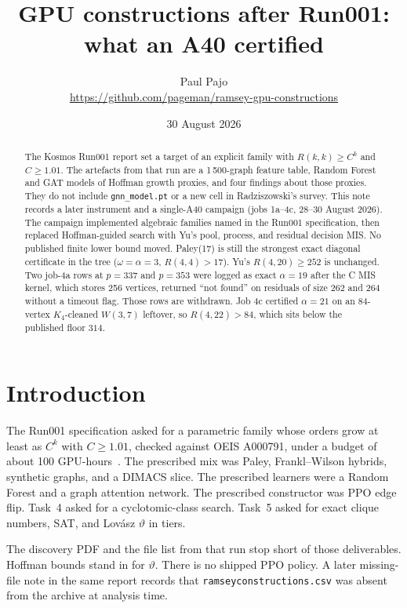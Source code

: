 \documentclass[11pt,a4paper]{article}
\title{GPU constructions after Run001:\\what an A40 certified}
\author{Paul Pajo\\[0.4em]
\small \url{https://github.com/pageman/ramsey-gpu-constructions}}
\date{30 August 2026}
\begin{document}
\maketitle

\begin{abstract}
The Kosmos Run001 report set a target of an explicit family with
$R(k,k)\ge C^k$ and $C\ge 1.01$. The artefacts from that run are a
1\,500-graph feature table, Random Forest and GAT models of Hoffman
growth proxies, and four findings about those proxies. They do not
include \texttt{gnn\_model.pt} or a new cell in Radziszowski's survey.
This note records a later instrument and a single-A40 campaign
(jobs 1a--4c, 28--30 August 2026). The campaign implemented algebraic
families named in the Run001 specification, then replaced Hoffman-guided
search with Yu's pool, process, and residual decision MIS.
No published finite lower bound moved. Paley(17) is still the strongest
exact diagonal certificate in the tree ($\omega=\alpha=3$, $R(4,4)>17$).
Yu's $R(4,20)\ge 252$ is unchanged. Two job-4a rows at $p=337$ and
$p=353$ were logged as exact $\alpha=19$ after the C MIS kernel, which
stores 256 vertices, returned ``not found'' on residuals of size 262 and
264 without a timeout flag. Those rows are withdrawn. Job 4c certified
$\alpha=21$ on an 84-vertex $K_4$-cleaned $W(3,7)$ leftover, so
$R(4,22)>84$, which sits below the published floor $314$.
\end{abstract}

\section{Introduction}

The Run001 specification asked for a parametric family whose orders grow
at least as $C^k$ with $C\ge 1.01$, checked against OEIS A000791, under
a budget of about 100 GPU-hours~\cite{kosmos}. The prescribed mix was
Paley, Frankl--Wilson hybrids, synthetic graphs, and a DIMACS slice.
The prescribed learners were a Random Forest and a graph attention
network. The prescribed constructor was PPO edge flip. Task~4 asked for
a cyclotomic-class search. Task~5 asked for exact clique numbers, SAT,
and Lov\'asz $\vartheta$ in tiers.

The discovery PDF and the file list from that run stop short of those
deliverables. Hoffman bounds stand in for $\vartheta$. There is no
shipped PPO policy. A later missing-file note in the same report
records that \texttt{ramseyconstructions.csv} was absent from the
archive at analysis time.
\end{document}
